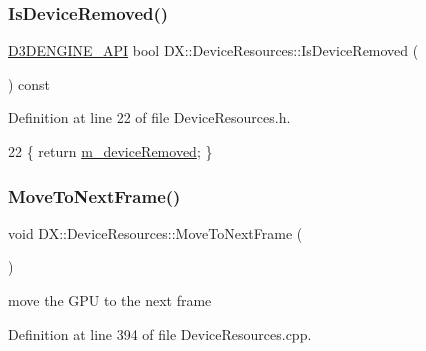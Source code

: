 \subsubsection{\texorpdfstring{Is\+Device\+Removed()}{IsDeviceRemoved()}}
{\footnotesize\ttfamily \mbox{\hyperlink{stdafx_8h_a8ee2d990c5dfba7794dd2b60741d7722}{D3\+D\+E\+N\+G\+I\+N\+E\+\_\+\+A\+PI}} bool D\+X\+::\+Device\+Resources\+::\+Is\+Device\+Removed (\begin{DoxyParamCaption}{ }\end{DoxyParamCaption}) const\hspace{0.3cm}{\ttfamily [inline]}}



Definition at line 22 of file Device\+Resources.\+h.


\begin{DoxyCode}
22 \{ \textcolor{keywordflow}{return} \mbox{\hyperlink{class_d_x_1_1_device_resources_af4d113c651dcae9a344094cfc02a6a09}{m\_deviceRemoved}}; \}
\end{DoxyCode}
\mbox{\label{class_d_x_1_1_device_resources_af7005ac5c0fb7c7582740d0a767398c6}} 
\subsubsection{\texorpdfstring{Move\+To\+Next\+Frame()}{MoveToNextFrame()}}
{\footnotesize\ttfamily void D\+X\+::\+Device\+Resources\+::\+Move\+To\+Next\+Frame (\begin{DoxyParamCaption}{ }\end{DoxyParamCaption})\hspace{0.3cm}{\ttfamily [private]}}



move the G\+PU to the next frame 



Definition at line 394 of file Device\+Resources.\+cpp.


